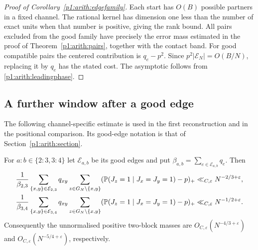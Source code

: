 \begin{proof}[Proof of Corollary~\ref{p1:arith:edgefamily}]
Each start has $O(B)$ possible partners in a fixed channel.  The rational
kernel has dimension one less than the number of exact units when that
number is positive, giving the rank bound.  All pairs excluded from the good
family have precisely the error mass estimated in the proof of
Theorem~\ref{p1:arith:pairs}, together with the contact band.
For good compatible pairs the centered contribution is $q_e-p^2$.
Since $p^2|\mathcal E_N|=O(B/N)$, replacing it by $q_e$ has the stated cost.
The asymptotic follows from \eqref{p1:arith:leadingphase}.
\end{proof}

\subsection{A further window after a good edge}
\label{p14:comp:pair-palm}

The following channel-specific estimate is used in the first reconstruction
and in the positional comparison. Its good-edge notation is that of
Section~\ref{p1:arith:section}.

\begin{proposition}\label{p1:arith:palm}
For $a:b\in\{2:3,3:4\}$ let $\mathcal E_{a,b}$ be its good edges and put
$\beta_{a,b}=\sum_{e\in\mathcal E_{a,b}}q_e$.  Then
\begin{align}
 \frac1{\beta_{2,3}}\sum_{\{x,y\}\in\mathcal E_{2,3}}q_{xy}
    \sum_{z\in G_N\setminus\{x,y\}}
       (\P(J_z=1\mid J_x=J_y=1)-p)_+
   &\ll_{C,\varepsilon}N^{-2/3+\varepsilon},\label{p1:arith:palm23}\\
 \frac1{\beta_{3,4}}\sum_{\{x,y\}\in\mathcal E_{3,4}}q_{xy}
    \sum_{z\in G_N\setminus\{x,y\}}
       (\P(J_z=1\mid J_x=J_y=1)-p)_+
   &\ll_{C,\varepsilon}N^{-1/2+\varepsilon}.\label{p1:arith:palm34}
\end{align}
Consequently the unnormalised positive two-block masses are
$O_{C,\varepsilon}(N^{-4/3+\varepsilon})$ and
$O_{C,\varepsilon}(N^{-5/4+\varepsilon})$, respectively.
\end{proposition}

